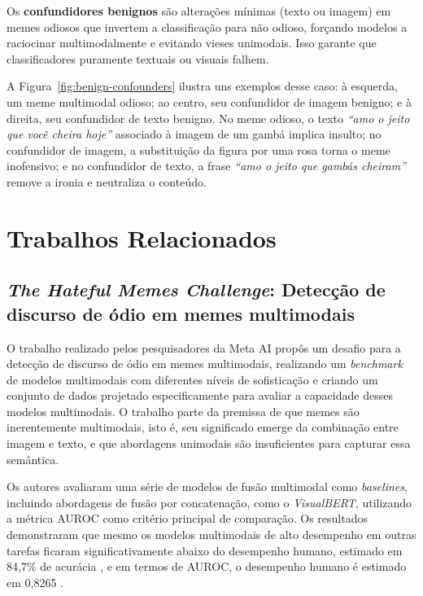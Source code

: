 Os \textbf{confundidores benignos} são alterações mínimas (texto ou imagem) em memes odiosos que invertem a classificação para não odioso, forçando modelos a raciocinar multimodalmente e evitando vieses unimodais. Isso garante que classificadores puramente textuais ou visuais falhem.

A Figura~\ref{fig:benign-confounders} ilustra uns exemplos desse caso: à esquerda, um meme multimodal odioso; ao centro, seu confundidor de imagem benigno; e à direita, seu confundidor de texto benigno. No meme odioso, o texto \textit{``amo o jeito que você cheira hoje''} associado à imagem de um gambá implica insulto; no confundidor de imagem, a substituição da figura por uma rosa torna o meme inofensivo; e no confundidor de texto, a frase \textit{``amo o jeito que gambás cheiram''} remove a ironia e neutraliza o conteúdo.

\section{Trabalhos Relacionados}

\subsection{\textit{The Hateful Memes Challenge}: Detecção de discurso de ódio em memes multimodais} 

O trabalho realizado pelos pesquisadores da Meta AI \cite{ArticleHatefulMemesChallenge2020} propôs um desafio para a detecção de discurso de ódio em memes multimodais, realizando um \textit{benchmark} de modelos multimodais com diferentes níveis de sofisticação e criando um conjunto de dados projetado especificamente para avaliar a capacidade desses modelos multimodais.
O trabalho parte da premissa de que memes são inerentemente multimodais, isto é, seu
significado emerge da combinação entre imagem e texto, e que abordagens unimodais são insuficientes para capturar essa semântica.

Os autores avaliaram uma série de modelos de fusão multimodal como \textit{baselines}, incluindo abordagens de fusão por concatenação, como o \textit{VisualBERT}, utilizando a métrica AUROC como critério principal de comparação. Os resultados demonstraram que mesmo os modelos multimodais de alto desempenho em outras tarefas ficaram significativamente abaixo do desempenho humano, estimado em 84,7\% de acurácia \cite{ArticleHatefulMemesChallenge2020}, e em termos de AUROC, o desempenho humano é estimado em 0,8265 \cite{metaai2020}.

